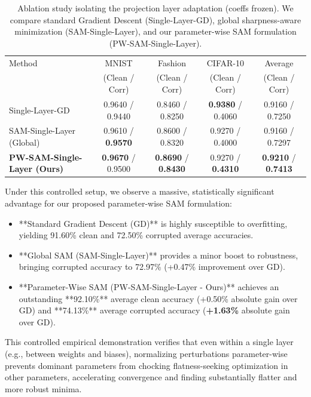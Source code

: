 \documentclass{article}
\theoremstyle{plain}
\theoremstyle{definition}
\theoremstyle{remark}
\begin{document}
\begin{table}[t]
\caption{Ablation study isolating the projection layer adaptation (coeffs frozen). We compare standard Gradient Descent (Single-Layer-GD), global sharpness-aware minimization (SAM-Single-Layer), and our parameter-wise SAM formulation (PW-SAM-Single-Layer).}
\label{tab:ablation_results_table}
\vskip 0.15in
\begin{center}
\begin{small}
\begin{sc}
\begin{tabular}{lcccc}
\toprule
Method & MNIST & Fashion & CIFAR-10 & Average \\
 & (Clean / Corr) & (Clean / Corr) & (Clean / Corr) & (Clean / Corr) \\
\midrule
Single-Layer-GD & 0.9640 / 0.9440 & 0.8460 / 0.8250 & \textbf{0.9380} / 0.4060 & 0.9160 / 0.7250 \\
SAM-Single-Layer (Global) & 0.9610 / \textbf{0.9570} & 0.8600 / 0.8320 & 0.9270 / 0.4000 & 0.9160 / 0.7297 \\
\textbf{PW-SAM-Single-Layer (Ours)} & \textbf{0.9670} / 0.9500 & \textbf{0.8690} / \textbf{0.8430} & 0.9270 / \textbf{0.4310} & \textbf{0.9210} / \textbf{0.7413} \\
\bottomrule
\end{tabular}
\end{sc}
\end{small}
\end{center}
\vskip -0.1in
\end{table}

Under this controlled setup, we observe a massive, statistically significant advantage for our proposed parameter-wise SAM formulation:
\begin{itemize}
    \item **Standard Gradient Descent (GD)** is highly susceptible to overfitting, yielding 91.60\% clean and 72.50\% corrupted average accuracies.
    \item **Global SAM (SAM-Single-Layer)** provides a minor boost to robustness, bringing corrupted accuracy to 72.97\% (+0.47\% improvement over GD).
    \item **Parameter-Wise SAM (PW-SAM-Single-Layer - Ours)** achieves an outstanding **92.10\%** average clean accuracy (+0.50\% absolute gain over GD) and **74.13\%** average corrupted accuracy (\textbf{+1.63\%} absolute gain over GD).
\end{itemize}
This controlled empirical demonstration verifies that even within a single layer (e.g., between weights and biases), normalizing perturbations parameter-wise prevents dominant parameters from chocking flatness-seeking optimization in other parameters, accelerating convergence and finding substantially flatter and more robust minima.
\end{document}
